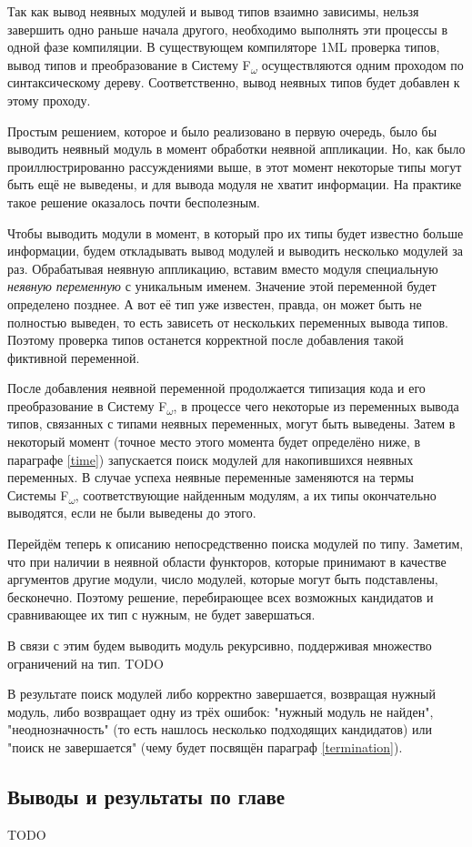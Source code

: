 \documentclass[../diploma.tex]{subfiles}
\begin{document}
Так как вывод неявных модулей и вывод типов взаимно зависимы, нельзя завершить одно раньше начала другого, необходимо выполнять эти процессы в одной фазе компиляции. В существующем компиляторе 1ML проверка типов, вывод типов и преобразование в Систему F\textsubscript{$\omega$} осуществляются одним проходом по синтаксическому дереву. Соответственно, вывод неявных типов будет добавлен к этому проходу.

Простым решением, которое и было реализовано в первую очередь, было бы выводить неявный модуль в момент обработки неявной аппликации. Но, как было проиллюстрированно рассуждениями выше, в этот момент некоторые типы могут быть ещё не выведены, и для вывода модуля не хватит информации. На практике такое решение оказалось почти бесполезным.

Чтобы выводить модули в момент, в который про их типы будет известно больше информации, будем откладывать вывод модулей и выводить несколько модулей за раз. Обрабатывая неявную аппликацию, вставим вместо модуля специальную \textit{неявную переменную} с уникальным именем. Значение этой переменной будет определено позднее. А вот её тип уже известен, правда, он может быть не полностью выведен, то есть зависеть от нескольких переменных вывода типов. Поэтому проверка типов останется корректной после добавления такой фиктивной переменной. 

После добавления неявной переменной продолжается типизация кода и его преобразование в Систему F\textsubscript{$\omega$}, в процессе чего некоторые из переменных вывода типов, связанных с типами неявных переменных, могут быть выведены. Затем в некоторый момент (точное место этого момента будет определёно ниже, в параграфе \ref{time}) запускается поиск модулей для накопившихся неявных переменных. В случае успеха неявные переменные заменяются на термы Системы F\textsubscript{$\omega$}, соответствующие найденным модулям, а их типы окончательно выводятся, если не были выведены до этого.

Перейдём теперь к описанию непосредственно поиска модулей по типу. Заметим, что при наличии в неявной области функторов, которые принимают в качестве аргументов другие модули, число модулей, которые могут быть подставлены, бесконечно. Поэтому решение, перебирающее всех возможных кандидатов и сравнивающее их тип с нужным, не будет завершаться.

В связи с этим будем выводить модуль рекурсивно, поддерживая множество ограничений на тип. TODO

В результате поиск модулей либо корректно завершается, возвращая нужный модуль, либо возвращает одну из трёх ошибок: "нужный модуль не найден", "неоднозначность" (то есть нашлось несколько подходящих кандидатов) или "поиск не завершается" (чему будет посвящён параграф \ref{termination}).

\subsection{Выводы и результаты по главе}

TODO
\end{document}
